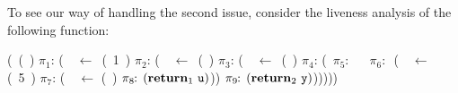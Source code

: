 \documentclass{sig-alternate}
\begin{document}


To see  our way of  handling the second  issue, consider the liveness
analysis of the following function:

\renewcommand{\arraystretch}{1}{
	  \begin{uprogram}
	   (\DEFINE\ (\pf~\pa)
	    $\pi_1\!\!:\, $(\LET\ \px\ $\leftarrow $\ (\CONS~1~\px) \IN
	        $\pi_2\!\!:\, $(\LET~\py\ $\leftarrow $\ (\CDR~\px) \IN  
           \hspace*{.05cm}     $\pi_3\!\!:\,
          $(\LET\ \pz\  $\leftarrow$\   (\NULLQ~\pa) \IN
	    \hspace*{.05cm}    $\pi_4\!\!:\,
          $(\SIF\ $\pi_5\!\!:\,$ \pz\ ~$\pi_6\!\!:\,$ (\LET~\ww\  $\leftarrow$  (\take~5~\px) \IN
	   \hspace*{1.15cm}    $\pi_7\!\!:\, $(\LET~\pu\  $\leftarrow$  (\CDR~\pw)  \IN
	    \hspace*{1.15cm}   $\pi_8\!\!:\,(\mbox{$\mathbf{ return}$}_1~\mbox{\tt u})$))
           \hspace*{.05cm} $\pi_9\!\!:\, (\mbox{$\mathbf{ return}$}_2~\mbox{\tt y})$)))))
	\end{uprogram}}
\medskip
\end{document}
